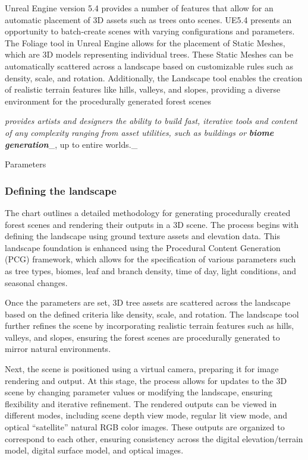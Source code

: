 \documentclass[12pt, man, dvipsnames, floatsintext]{apa7}
\begin{document}
Unreal Engine version 5.4 provides a number of features that allow for
an automatic placement of 3D assets such as trees onto scenes. UE5.4
presents an opportunity to batch-create scenes with varying
configurations and parameters. The Foliage tool in Unreal Engine allows
for the placement of Static Meshes, which are 3D models representing
individual trees. These Static Meshes can be automatically scattered
across a landscape based on customizable rules such as density, scale,
and rotation. Additionally, the Landscape tool enables the creation of
realistic terrain features like hills, valleys, and slopes, providing a
diverse environment for the procedurally generated forest scenes

\emph{provides artists and designers the ability to build fast,
iterative tools and content of any complexity ranging from asset
utilities, such as buildings or} \textbf{\emph{biome generation}}\_, up
to entire worlds.\_

Parameters

\hypertarget{defining-the-landscape}{%
\subsubsection{\texorpdfstring{\textbf{Defining the
landscape}}{Defining the landscape}}\label{defining-the-landscape}}

The chart outlines a detailed methodology for generating procedurally
created forest scenes and rendering their outputs in a 3D scene. The
process begins with defining the landscape using ground texture assets
and elevation data. This landscape foundation is enhanced using the
Procedural Content Generation (PCG) framework, which allows for the
specification of various parameters such as tree types, biomes, leaf and
branch density, time of day, light conditions, and seasonal changes.

Once the parameters are set, 3D tree assets are scattered across the
landscape based on the defined criteria like density, scale, and
rotation. The landscape tool further refines the scene by incorporating
realistic terrain features such as hills, valleys, and slopes, ensuring
the forest scenes are procedurally generated to mirror natural
environments.

Next, the scene is positioned using a virtual camera, preparing it for
image rendering and output. At this stage, the process allows for
updates to the 3D scene by changing parameter values or modifying the
landscape, ensuring flexibility and iterative refinement. The rendered
outputs can be viewed in different modes, including scene depth view
mode, regular lit view mode, and optical ``satellite'' natural RGB color
images. These outputs are organized to correspond to each other,
ensuring consistency across the digital elevation/terrain model, digital
surface model, and optical images.
\end{document}
